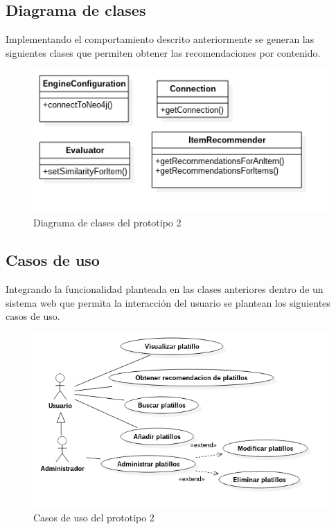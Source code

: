     \subsection{Diagrama de clases}
    Implementando el comportamiento descrito anteriormente se generan las siguientes clases que permiten obtener las recomendaciones por contenido.
          \begin{figure}[h!]
          \centering
          \includegraphics[width=12cm]{./images/p2_classes.png}
          \caption{Diagrama de clases del prototipo 2}
        \end{figure}

    \subsection{Casos de uso}
    Integrando la funcionalidad planteada en las clases anteriores dentro de un sistema web que permita la interacción del usuario se plantean los siguientes casos de uso.
    \begin{figure}[h!]
      \centering
      \includegraphics[width=16cm]{./images/prototipo2.png}
      \caption{Casos de uso del prototipo 2}
    \end{figure}
    
